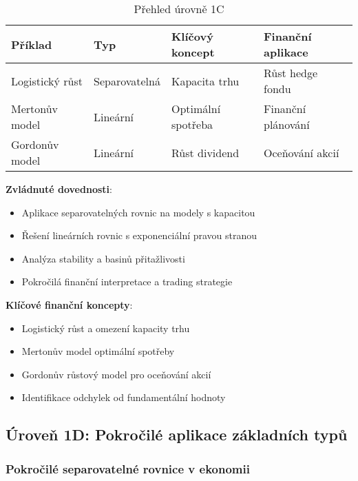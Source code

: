 \begin{table}[h]
\centering
\caption{Přehled úrovně 1C}
\label{tab:prehled-1c}
\begin{tabular}{@{}llll@{}}
\toprule
\textbf{Příklad} & \textbf{Typ} & \textbf{Klíčový koncept} & \textbf{Finanční aplikace} \\
\midrule
Logistický růst & Separovatelná & Kapacita trhu & Růst hedge fondu \\
Mertonův model & Lineární & Optimální spotřeba & Finanční plánování \\
Gordonův model & Lineární & Růst dividend & Oceňování akcií \\
\bottomrule
\end{tabular}
\end{table}

\noindent\textbf{Zvládnuté dovednosti}:
\begin{itemize}
\item Aplikace separovatelných rovnic na modely s kapacitou
\item Řešení lineárních rovnic s exponenciální pravou stranou
\item Analýza stability a basinů přitažlivosti
\item Pokročilá finanční interpretace a trading strategie
\end{itemize}

\noindent\textbf{Klíčové finanční koncepty}:
\begin{itemize}
\item Logistický růst a omezení kapacity trhu
\item Mertonův model optimální spotřeby
\item Gordonův růstový model pro oceňování akcií
\item Identifikace odchylek od fundamentální hodnoty
\end{itemize}



\subsection{Úroveň 1D: Pokročilé aplikace základních typů}
\label{sec:uroven-1d}

\subsubsection{Pokročilé separovatelné rovnice v ekonomii}
\label{subsec:pokrocile-separovatelne}

